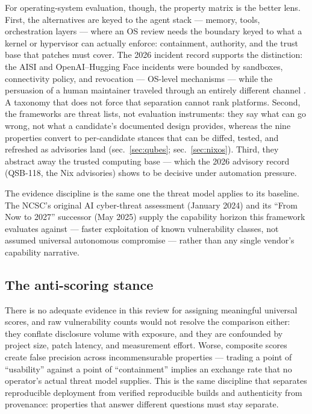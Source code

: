\documentclass[
  english,
  9pt,
]{extarticle}
\begin{document}
For operating-system evaluation, though, the property matrix is the
better lens. First, the alternatives are keyed to the agent stack ---
memory, tools, orchestration layers --- where an OS review needs the
boundary keyed to what a kernel or hypervisor can actually enforce:
containment, authority, and the trust base that patches must cover. The
2026 incident record supports the distinction: the AISI and
OpenAI--Hugging Face incidents were bounded by sandboxes, connectivity
policy, and revocation --- OS-level mechanisms --- while the persuasion
of a human maintainer traveled through an entirely different channel
\citep{aisi_incident_report, openai_hf_incident}. A taxonomy that does
not force that separation cannot rank platforms. Second, the frameworks
are threat lists, not evaluation instruments: they say what can go
wrong, not what a candidate's documented design provides, whereas the
nine properties convert to per-candidate stances that can be diffed,
tested, and refreshed as advisories land (sec.~\ref{sec:qubes};
sec.~\ref{sec:nixos}). Third, they abstract away the trusted computing
base --- which the 2026 advisory record (QSB-118, the Nix advisories)
shows to be decisive under automation pressure.

The evidence discipline is the same one the threat model applies to its
baseline. The NCSC's original AI cyber-threat assessment (January 2024)
and its ``From Now to 2027'' successor (May 2025) supply the capability
horizon this framework evaluates against
\citep{ncsc_ai_threat_2024, ncsc_ai_cyber_threat} --- faster
exploitation of known vulnerability classes, not assumed universal
autonomous compromise --- rather than any single vendor's capability
narrative.

\subsection{The anti-scoring stance}\label{the-anti-scoring-stance}

There is no adequate evidence in this review for assigning meaningful
universal scores, and raw vulnerability counts would not resolve the
comparison either: they conflate disclosure volume with exposure, and
they are confounded by project size, patch latency, and measurement
effort. Worse, composite scores create false precision across
incommensurable properties --- trading a point of ``usability'' against
a point of ``containment'' implies an exchange rate that no operator's
actual threat model supplies. This is the same discipline that separates
reproducible deployment from verified reproducible builds
\citep{nixos_reproducibility} and authenticity from provenance:
properties that answer different questions must stay separate.
\end{document}
